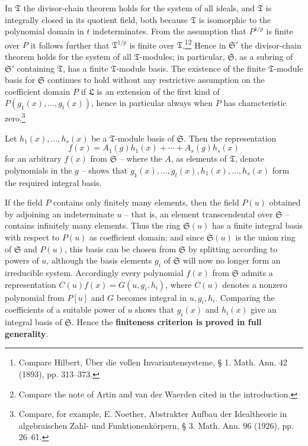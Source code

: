 In $\mathfrak T$ the divisor-chain theorem holds for the system of all ideals, and $\mathfrak T$ is integrally closed in its quotient field, both because $\mathfrak T$ is isomorphic to the polynomial domain in $t$ indeterminates. From the assumption that $P^{1/p}$ is finite over $P$ it follows further that $\mathfrak T^{1/p}$ is finite over $\mathfrak T$.\footnote{Compare Hilbert, Über die vollen Invariantensysteme, § 1. Math. Ann. 42 (1893), pp. 313--373.}\footnote{Compare the note of Artin and van der Waerden cited in the introduction.} Hence in $\mathfrak S'$ the divisor-chain theorem holds for the system of all $\mathfrak T$-modules; in particular, $\mathfrak S$, as a subring of $\mathfrak S'$ containing $\mathfrak T$, has a finite $\mathfrak T$-module basis. The existence of the finite $\mathfrak T$-module basis for $\mathfrak S$ continues to hold without any restrictive assumption on the coefficient domain $P$ if $\mathfrak L$ is an extension of the first kind of $P(g_1(x),\ldots,g_t(x))$, hence in particular always when $P$ has characteristic zero.\footnote{Compare, for example, E. Noether, Abstrakter Aufbau der Idealtheorie in algebraischen Zahl- und Funktionenkörpern, § 3. Math. Ann. 96 (1926), pp. 26--61.}

Let $h_1(x),\ldots,h_s(x)$ be a $\mathfrak T$-module basis of $\mathfrak S$. Then the representation
\[
 f(x)=A_1(g)h_1(x)+\cdots+A_s(g)h_s(x)
\]
for an arbitrary $f(x)$ from $\mathfrak S$ -- where the $A$, as elements of $\mathfrak T$, denote polynomials in the $g$ -- shows that $g_1(x),\ldots,g_t(x),h_1(x),\ldots,h_s(x)$ form the required integral basis.

If the field $P$ contains only finitely many elements, then the field $P(u)$ obtained by adjoining an indeterminate $u$ -- that is, an element transcendental over $\mathfrak S$ -- contains infinitely many elements. Thus the ring $\mathfrak S(u)$ has a finite integral basis with respect to $P(u)$ as coefficient domain; and since $\mathfrak S(u)$ is the union ring of $\mathfrak S$ and $P(u)$, this basis can be chosen from $\mathfrak S$ by splitting according to powers of $u$, although the basis elements $g_i$ of $\mathfrak S$ will now no longer form an irreducible system. Accordingly every polynomial $f(x)$ from $\mathfrak S$ admits a representation $C(u)f(x)=G(u,g_i,h_i)$, where $C(u)$ denotes a nonzero polynomial from $P[u]$ and $G$ becomes integral in $u,g_i,h_i$. Comparing the coefficients of a suitable power of $u$ shows that $g_i(x)$ and $h_i(x)$ give an integral basis of $\mathfrak S$. Hence the \textbf{finiteness criterion is proved in full generality}.

